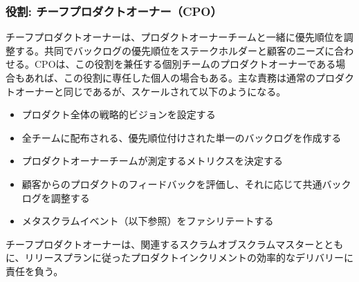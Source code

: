 \documentclass[12pt,a4paper,parskip=full]{scrartcl}
\begin{document}
\subsubsection{役割: チーフプロダクトオーナー（CPO）}\label{role-the-chief-product-owner}

チーフプロダクトオーナーは、プロダクトオーナーチームと一緒に優先順位を調整する。共同でバックログの優先順位をステークホルダーと顧客のニーズに合わせる。CPOは、この役割を兼任する個別チームのプロダクトオーナーである場合もあれば、この役割に専任した個人の場合もある。主な責務は通常のプロダクトオーナーと同じであるが、スケールされて以下のようになる。

\begin{itemize}
\itemsep1pt\parskip0pt

\item
プロダクト全体の戦略的ビジョンを設定する
\item
全チームに配布される、優先順位付けされた単一のバックログを作成する
\item
プロダクトオーナーチームが測定するメトリクスを決定する
\item
顧客からのプロダクトのフィードバックを評価し、それに応じて共通バックログを調整する
\item
メタスクラムイベント（以下参照）をファシリテートする
\end{itemize}

チーフプロダクトオーナーは、関連するスクラムオブスクラムマスターとともに、リリースプランに従ったプロダクトインクリメントの効率的なデリバリーに責任を負う。
\end{document}
